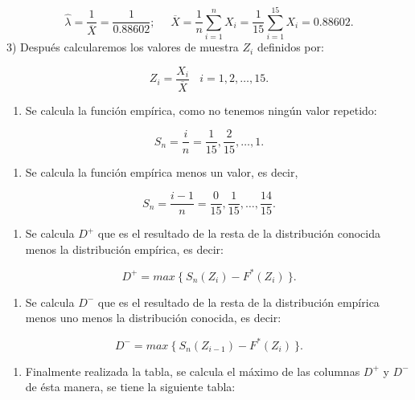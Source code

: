 \documentclass[
  a4paper,
  oneside,
  openany]{book}
\providecommand{\tightlist}{%
  \setlength{\itemsep}{0pt}\setlength{\parskip}{0pt}}
\begin{document}
\[\hat{\lambda}=\frac{1}{\overline{X}}=\frac{1}{0.88602}; \ \ \ \ \ \  \overline{X}=\frac{1}{n}\sum_{i=1}^{n}X_{i}=\frac{1}{15}\sum_{i=1}^{15}X_{i}=0.88602.\]
3) Después calcularemos los valores de muestra \(Z_{i}\) definidos por:

\[Z_{i}=\frac{X_{i}}{\overline{X}} \ \ \ \ i=1,2,\ldots,15.\]

\begin{enumerate}
\def\labelenumi{\arabic{enumi})}
\setcounter{enumi}{3}
\tightlist
\item
  Se calcula la función empírica, como no tenemos ningún valor repetido:
\end{enumerate}

\[S_{n}= \frac{i}{n}=\frac{1}{15},\frac{2}{15}, \ldots, 1. \]

\begin{enumerate}
\def\labelenumi{\arabic{enumi})}
\setcounter{enumi}{4}
\tightlist
\item
  Se calcula la función empírica menos un valor, es decir,
\end{enumerate}

\[S_{n}= \frac{i-1}{n}=\frac{0}{15},\frac{1}{15}, \ldots, \frac{14}{15}.\]

\begin{enumerate}
\def\labelenumi{\arabic{enumi})}
\setcounter{enumi}{5}
\tightlist
\item
  Se calcula \(D^+\) que es el resultado de la resta de la distribución conocida menos la distribución empírica, es decir:
\end{enumerate}

\[D^+= max \ \{ \ S_{n}(Z_{i})-F^*(Z_{i}) \ \}.\]

\begin{enumerate}
\def\labelenumi{\arabic{enumi})}
\setcounter{enumi}{6}
\tightlist
\item
  Se calcula \(D^-\) que es el resultado de la resta de la distribución empírica menos uno menos la distribución conocida, es decir:
\end{enumerate}

\[D^-= max \  \{\ S_{n}(Z_{i-1})-F^*(Z_{i}) \ \}.\]

\begin{enumerate}
\def\labelenumi{\arabic{enumi})}
\setcounter{enumi}{7}
\tightlist
\item
  Finalmente realizada la tabla, se calcula el máximo de las columnas \(D^+\) y \(D^-\) de ésta manera, se tiene la siguiente tabla:
\end{enumerate}
\end{document}

